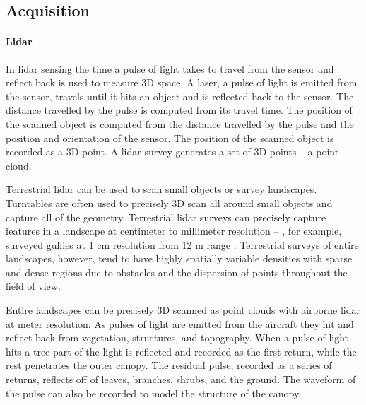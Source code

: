 \documentclass{article}
\begin{document}
\subsection{Acquisition}
%
\paragraph{Lidar}	
In lidar sensing 
the time a pulse of light takes to travel from the sensor and reflect back 
is used to measure 3D space.
%
A laser, a pulse of light is emitted from the sensor, 
travels until it hits an object and is reflected back to the sensor. 
The distance travelled by the pulse is computed from its travel time. 
The position of the scanned object is computed 
from the distance travelled by the pulse
and
the position and orientation of the sensor. 
%
The position of the scanned object is recorded as a 3D point. 
A lidar survey generates a set of 3D points -- a point cloud. 

Terrestrial lidar can be used to scan small objects or survey landscapes. 
Turntables are often used to precisely 3D scan all around small objects and capture all of the geometry. 
Terrestrial lidar surveys can precisely capture features in a landscape at centimeter to millimeter resolution -- 
\citeauthor{Starek2013}, for example, surveyed gullies at 1 cm resolution from 12 m range \citeyearpar{Starek2013}. 
%
Terrestrial surveys of entire landscapes, however, tend to have highly spatially variable densities
with sparse and dense regions
due to obstacles 
and the dispersion of points throughout the field of view.

Entire landscapes can be precisely 3D scanned as point clouds with airborne lidar at meter resolution.
%
As pulses of light are emitted from the aircraft they hit and reflect back from vegetation, structures, and topography.
When a pulse of light hits a tree part of the light is reflected 
and recorded as the first return, while the rest penetrates the outer canopy. 
The residual pulse, recorded as a series of returns, reflects off of leaves, branches, 
shrubs, and the ground. 
The waveform of the pulse can also be recorded to model the structure of the canopy.
\end{document}
